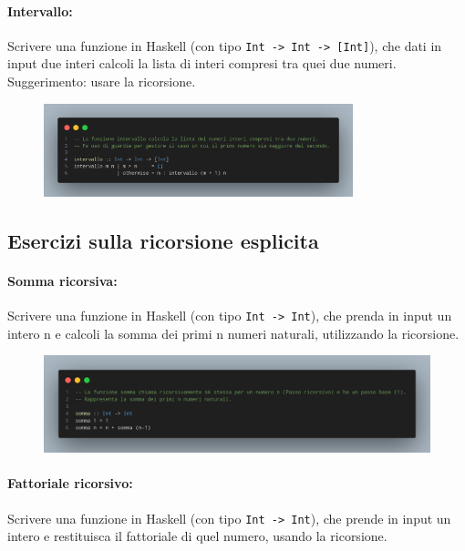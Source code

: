 \paragraph{Intervallo:} Scrivere una funzione in Haskell (con tipo \texttt{Int -> Int -> [Int]}), 
che dati in input due interi calcoli la lista di interi compresi tra quei due numeri. Suggerimento:
usare la ricorsione.

\begin{figure}[!h]
    \centering
    \includegraphics[width=0.8\textwidth]{images/Intervallo.png}
\end{figure}
\pagebreak
\subsection{Esercizi sulla ricorsione esplicita}

\paragraph{Somma ricorsiva:} Scrivere una funzione in Haskell (con tipo \texttt{Int -> Int}), 
che prenda in input un intero n e calcoli la somma dei primi n numeri naturali, utilizzando la ricorsione.

\begin{figure}[!h]
    \centering
    \includegraphics[width=1\textwidth]{images/Somma2.png}
\end{figure}

\paragraph{Fattoriale ricorsivo:} Scrivere una funzione in Haskell (con tipo \texttt{Int -> Int}),
che prende in input un intero e restituisca il fattoriale di quel numero, usando la ricorsione.

